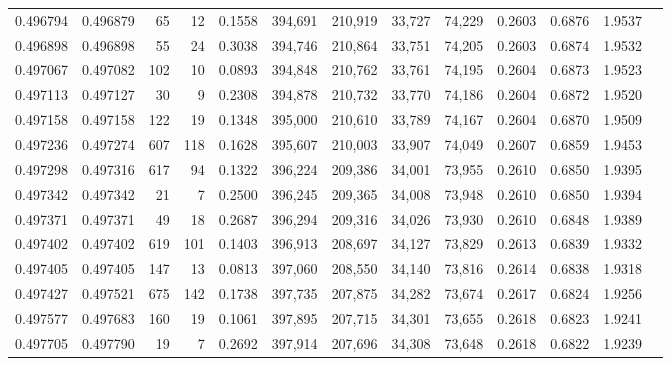 \begin{tabular}{rrrrrrrrrrrrr}
0.496794 & 0.496879 &    65 &    12 &                                     0.1558 & 394,691 & 210,919 &  33,727 &  74,229 & 0.2603 & 0.6876 & 1.9537 \\
0.496898 & 0.496898 &    55 &    24 &                                     0.3038 & 394,746 & 210,864 &  33,751 &  74,205 & 0.2603 & 0.6874 & 1.9532 \\
0.497067 & 0.497082 &   102 &    10 &                                     0.0893 & 394,848 & 210,762 &  33,761 &  74,195 & 0.2604 & 0.6873 & 1.9523 \\
0.497113 & 0.497127 &    30 &     9 &                                     0.2308 & 394,878 & 210,732 &  33,770 &  74,186 & 0.2604 & 0.6872 & 1.9520 \\
0.497158 & 0.497158 &   122 &    19 &                                     0.1348 & 395,000 & 210,610 &  33,789 &  74,167 & 0.2604 & 0.6870 & 1.9509 \\
0.497236 & 0.497274 &   607 &   118 &                                     0.1628 & 395,607 & 210,003 &  33,907 &  74,049 & 0.2607 & 0.6859 & 1.9453 \\
0.497298 & 0.497316 &   617 &    94 &                                     0.1322 & 396,224 & 209,386 &  34,001 &  73,955 & 0.2610 & 0.6850 & 1.9395 \\
0.497342 & 0.497342 &    21 &     7 &                                     0.2500 & 396,245 & 209,365 &  34,008 &  73,948 & 0.2610 & 0.6850 & 1.9394 \\
0.497371 & 0.497371 &    49 &    18 &                                     0.2687 & 396,294 & 209,316 &  34,026 &  73,930 & 0.2610 & 0.6848 & 1.9389 \\
0.497402 & 0.497402 &   619 &   101 &                                     0.1403 & 396,913 & 208,697 &  34,127 &  73,829 & 0.2613 & 0.6839 & 1.9332 \\
0.497405 & 0.497405 &   147 &    13 &                                     0.0813 & 397,060 & 208,550 &  34,140 &  73,816 & 0.2614 & 0.6838 & 1.9318 \\
0.497427 & 0.497521 &   675 &   142 &                                     0.1738 & 397,735 & 207,875 &  34,282 &  73,674 & 0.2617 & 0.6824 & 1.9256 \\
0.497577 & 0.497683 &   160 &    19 &                                     0.1061 & 397,895 & 207,715 &  34,301 &  73,655 & 0.2618 & 0.6823 & 1.9241 \\
0.497705 & 0.497790 &    19 &     7 &                                     0.2692 & 397,914 & 207,696 &  34,308 &  73,648 & 0.2618 & 0.6822 & 1.9239 \\

\end{tabular}
